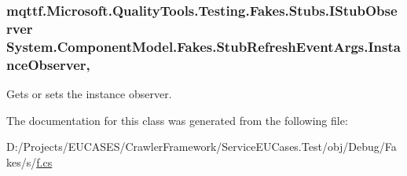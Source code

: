 \hypertarget{class_system_1_1_component_model_1_1_fakes_1_1_stub_refresh_event_args_ad1357ebd0deed00f5ad7ddbb3bbc4a38}{
\subsubsection[{Instance\-Observer}]{\setlength{\rightskip}{0pt plus 5cm}mqttf.\-Microsoft.\-Quality\-Tools.\-Testing.\-Fakes.\-Stubs.\-I\-Stub\-Observer System.\-Component\-Model.\-Fakes.\-Stub\-Refresh\-Event\-Args.\-Instance\-Observer\hspace{0.3cm}{\ttfamily [get]}, {\ttfamily [set]}}}\label{class_system_1_1_component_model_1_1_fakes_1_1_stub_refresh_event_args_ad1357ebd0deed00f5ad7ddbb3bbc4a38}


Gets or sets the instance observer.



The documentation for this class was generated from the following file\-:\begin{DoxyCompactItemize}
\item 
D\-:/\-Projects/\-E\-U\-C\-A\-S\-E\-S/\-Crawler\-Framework/\-Service\-E\-U\-Cases.\-Test/obj/\-Debug/\-Fakes/s/\hyperlink{s_2f_8cs}{f.\-cs}\end{DoxyCompactItemize}
